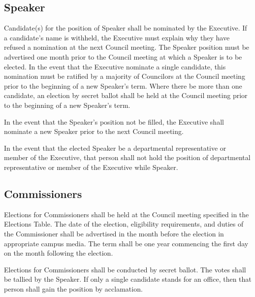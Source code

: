 \subsection{Speaker}
\begin{longenum}[ label*=\thesubsection.\arabic*., align=left]
	\item Candidate(s) for the position of Speaker shall be nominated by the Executive.    If a candidate's name is withheld, the Executive must explain why they have refused a nomination at the next Council meeting. The Speaker position must be advertised one month prior to the Council meeting at which a Speaker is to be elected.   In the event that the Executive nominate a single candidate, this nomination must be ratified by a majority of Councilors at the Council meeting prior to the beginning of a new Speaker's term. Where there be more than one candidate, an election by secret ballot shall be held at the Council meeting prior to the beginning of a new Speaker's term.

	\item In the event that the Speaker's position not be filled, the Executive shall nominate a new Speaker prior to the next Council meeting.
	 
	\item In the event that the elected Speaker be a departmental representative or member of the Executive, that person shall not hold the position of departmental representative or member of the Executive while Speaker.
\end{longenum}

\subsection{Commissioners}
\begin{longenum}[ label*=\thesubsection.\arabic*., align=left]
\item Elections for Commissioners shall be held at the Council meeting specified in the Elections Table. The date of the election, eligibility requirements, and duties of the Commissioner shall be advertised in the month before the election in appropriate campus media. The term shall be one year commencing the first day on the month following the election.
 
\item Elections for Commissioners shall be conducted by secret ballot. The votes shall be tallied by the Speaker. If only a single candidate stands for an office, then that person shall gain the position by acclamation.
 
\end{longenum}
\newpage


